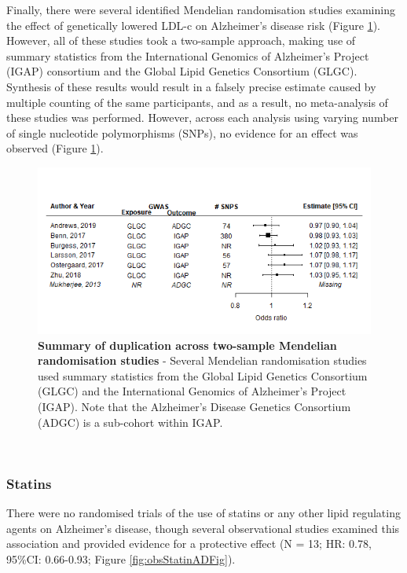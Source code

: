 \documentclass[a4paper, twoside]{templates/ociamthesis}
\begin{document}
Finally, there were several identified Mendelian randomisation studies examining the effect of genetically lowered LDL-c on Alzheimer's disease risk (Figure \ref{fig:mrDuplication}). However, all of these studies took a two-sample approach, making use of summary statistics from the International Genomics of Alzheimer's Project (IGAP) consortium and the Global Lipid Genetics Consortium (GLGC). Synthesis of these results would result in a falsely precise estimate caused by multiple counting of the same participants, and as a result, no meta-analysis of these studies was performed. However, across each analysis using varying number of single nucleotide polymorphisms (SNPs), no evidence for an effect was observed (Figure \ref{fig:mrDuplication}).





\begin{figure}[H]

{\centering \includegraphics[width=0.8\linewidth]{figures/sys-rev/mrDuplication} 

}

\caption[Summary of duplication across two-sample Mendelian randomisation studies]{\textbf{Summary of duplication across two-sample Mendelian randomisation studies} - Several Mendelian randomisation studies used summary statistics from the Global Lipid Genetics Consortium (GLGC) and the International Genomics of Alzheimer's Project (IGAP). Note that the Alzheimer's Disease Genetics Consortium (ADGC) is a sub-cohort within IGAP.}\label{fig:mrDuplication}
\end{figure}

~

\hypertarget{statins-1}{%
\subsubsection{Statins}\label{statins-1}}

There were no randomised trials of the use of statins or any other lipid regulating agents on Alzheimer's disease, though several observational studies examined this association and provided evidence for a protective effect (N = 13; HR: 0.78, 95\%CI: 0.66-0.93; Figure \ref{fig:obsStatinADFig}).
\end{document}
